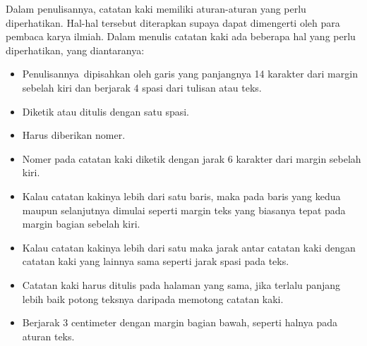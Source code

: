 \vspace{\baselineskip}
Dalam penulisannya, catatan kaki memiliki aturan-aturan yang perlu diperhatikan. Hal-hal tersebut diterapkan supaya dapat dimengerti oleh para pembaca karya ilmiah. Dalam menulis catatan kaki ada beberapa hal yang perlu diperhatikan, yang diantaranya:\par

\begin{itemize}
	\vspace{\baselineskip}
	\item Penulisannya dipisahkan oleh garis yang panjangnya 14 karakter dari margin sebelah kiri dan berjarak 4 spasi dari tulisan atau teks.\par

\vspace{\baselineskip}
	\item Diketik atau ditulis dengan satu spasi.\par

\vspace{\baselineskip}
	\item Harus diberikan nomer.\par

\vspace{\baselineskip}
	\item Nomer pada catatan kaki diketik dengan jarak 6 karakter dari margin sebelah kiri.\par

\vspace{\baselineskip}
	\item Kalau catatan kakinya lebih dari satu baris, maka pada baris yang kedua maupun selanjutnya dimulai seperti margin teks yang biasanya tepat pada margin bagian sebelah kiri.\par

\vspace{\baselineskip}
	\item Kalau catatan kakinya lebih dari satu maka jarak antar catatan kaki dengan catatan kaki yang lainnya sama seperti jarak spasi pada teks.\par

\vspace{\baselineskip}
	\item Catatan kaki harus ditulis pada halaman yang sama, jika terlalu panjang lebih baik potong teksnya daripada memotong catatan kaki.\par

\vspace{\baselineskip}
	\item Berjarak 3 centimeter dengan margin bagian bawah, seperti halnya pada aturan teks.\par


\end{itemize}
